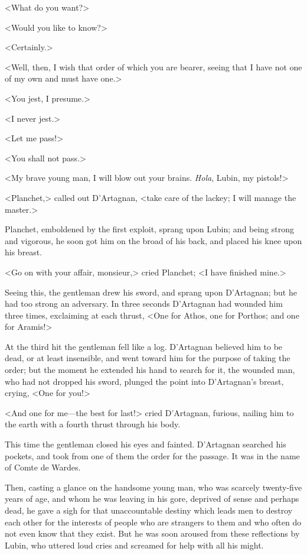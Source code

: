 <What do you want?> 

<Would you like to know?> 

<Certainly.> 

<Well, then, I wish that order of which you are bearer, seeing that I have not one of my own and must have one.> 

<You jest, I presume.> 

<I never jest.> 

<Let me pass!> 

<You shall not pass.> 

<My brave young man, I will blow out your brains. \emph{Hola}, Lubin, my pistols!> 

<Planchet,> called out D'Artagnan, <take care of the lackey; I will manage the master.> 

Planchet, emboldened by the first exploit, sprang upon Lubin; and being strong and vigorous, he soon got him on the broad of his back, and placed his knee upon his breast. 

<Go on with your affair, monsieur,> cried Planchet; <I have finished mine.> 

Seeing this, the gentleman drew his sword, and sprang upon D'Artagnan; but he had too strong an adversary. In three seconds D'Artagnan had wounded him three times, exclaiming at each thrust, <One for Athos, one for Porthos; and one for Aramis!> 

At the third hit the gentleman fell like a log. D'Artagnan believed him to be dead, or at least insensible, and went toward him for the purpose of taking the order; but the moment he extended his hand to search for it, the wounded man, who had not dropped his sword, plunged the point into D'Artagnan's breast, crying, <One for you!> 

<And one for me—the best for last!> cried D'Artagnan, furious, nailing him to the earth with a fourth thrust through his body. 

This time the gentleman closed his eyes and fainted. D'Artagnan searched his pockets, and took from one of them the order for the passage. It was in the name of Comte de Wardes. 

Then, casting a glance on the handsome young man, who was scarcely twenty-five years of age, and whom he was leaving in his gore, deprived of sense and perhaps dead, he gave a sigh for that unaccountable destiny which leads men to destroy each other for the interests of people who are strangers to them and who often do not even know that they exist. But he was soon aroused from these reflections by Lubin, who uttered loud cries and screamed for help with all his might. 

